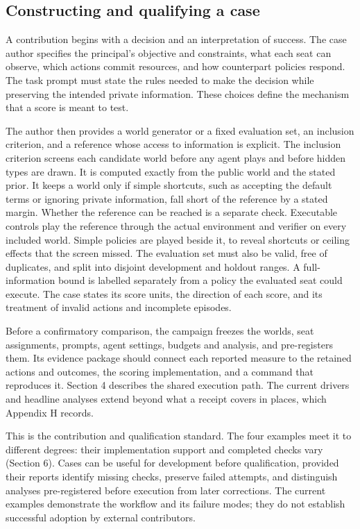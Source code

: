 \subsection{Constructing and qualifying a case}
\label{sec:case-construction}

A contribution begins with a decision and an interpretation of success.
The case author specifies the principal's objective and constraints, what each
seat can observe, which actions commit resources, and how counterpart
policies respond. The task prompt must state the rules needed to make the
decision while preserving the intended private information. These
choices define the mechanism that a score is meant to test.

The author then provides a world generator or a fixed evaluation set, an inclusion
criterion, and a reference whose access to information is explicit. The inclusion criterion
screens each candidate world before any agent plays and before hidden
types are drawn. It is computed exactly from the public world and the stated
prior. It keeps a world only if simple shortcuts, such as accepting the
default terms or ignoring private information, fall short of the reference
by a stated margin. Whether the reference can be reached is a separate
check. Executable controls play the reference through the actual environment and
verifier on every included world. Simple policies are played beside it, to reveal
shortcuts or ceiling effects that the screen missed. The evaluation set must also be
valid, free of duplicates, and split into disjoint development and holdout
ranges. A full-information bound is labelled separately from a policy
the evaluated seat could execute. The case states its score units,
the direction of each score, and its treatment of invalid actions and incomplete episodes.

Before a confirmatory comparison, the campaign freezes the worlds,
seat assignments, prompts, agent settings, budgets and analysis, and pre-registers them. Its
evidence package should connect each reported measure to the retained
actions and outcomes, the scoring implementation, and a command that
reproduces it. Section 4 describes the shared execution path. The current drivers
and headline analyses extend beyond what a receipt covers in places, which
Appendix H records.

This is the contribution and qualification standard. The four examples meet it
to different degrees: their implementation support and completed checks vary
(Section 6). Cases can be useful for development before
qualification, provided their reports identify missing checks, preserve
failed attempts, and distinguish analyses pre-registered before execution from
later corrections. The current examples demonstrate the workflow and
its failure modes; they do not establish successful adoption by external
contributors.
